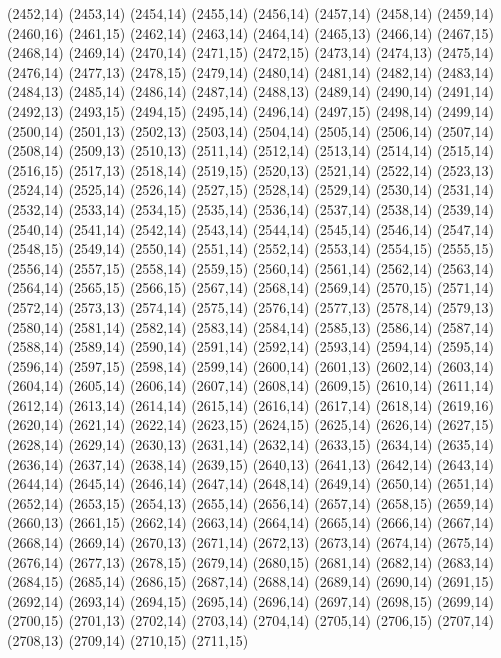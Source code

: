 (2452,14)
(2453,14)
(2454,14)
(2455,14)
(2456,14)
(2457,14)
(2458,14)
(2459,14)
(2460,16)
(2461,15)
(2462,14)
(2463,14)
(2464,14)
(2465,13)
(2466,14)
(2467,15)
(2468,14)
(2469,14)
(2470,14)
(2471,15)
(2472,15)
(2473,14)
(2474,13)
(2475,14)
(2476,14)
(2477,13)
(2478,15)
(2479,14)
(2480,14)
(2481,14)
(2482,14)
(2483,14)
(2484,13)
(2485,14)
(2486,14)
(2487,14)
(2488,13)
(2489,14)
(2490,14)
(2491,14)
(2492,13)
(2493,15)
(2494,15)
(2495,14)
(2496,14)
(2497,15)
(2498,14)
(2499,14)
(2500,14)
(2501,13)
(2502,13)
(2503,14)
(2504,14)
(2505,14)
(2506,14)
(2507,14)
(2508,14)
(2509,13)
(2510,13)
(2511,14)
(2512,14)
(2513,14)
(2514,14)
(2515,14)
(2516,15)
(2517,13)
(2518,14)
(2519,15)
(2520,13)
(2521,14)
(2522,14)
(2523,13)
(2524,14)
(2525,14)
(2526,14)
(2527,15)
(2528,14)
(2529,14)
(2530,14)
(2531,14)
(2532,14)
(2533,14)
(2534,15)
(2535,14)
(2536,14)
(2537,14)
(2538,14)
(2539,14)
(2540,14)
(2541,14)
(2542,14)
(2543,14)
(2544,14)
(2545,14)
(2546,14)
(2547,14)
(2548,15)
(2549,14)
(2550,14)
(2551,14)
(2552,14)
(2553,14)
(2554,15)
(2555,15)
(2556,14)
(2557,15)
(2558,14)
(2559,15)
(2560,14)
(2561,14)
(2562,14)
(2563,14)
(2564,14)
(2565,15)
(2566,15)
(2567,14)
(2568,14)
(2569,14)
(2570,15)
(2571,14)
(2572,14)
(2573,13)
(2574,14)
(2575,14)
(2576,14)
(2577,13)
(2578,14)
(2579,13)
(2580,14)
(2581,14)
(2582,14)
(2583,14)
(2584,14)
(2585,13)
(2586,14)
(2587,14)
(2588,14)
(2589,14)
(2590,14)
(2591,14)
(2592,14)
(2593,14)
(2594,14)
(2595,14)
(2596,14)
(2597,15)
(2598,14)
(2599,14)
(2600,14)
(2601,13)
(2602,14)
(2603,14)
(2604,14)
(2605,14)
(2606,14)
(2607,14)
(2608,14)
(2609,15)
(2610,14)
(2611,14)
(2612,14)
(2613,14)
(2614,14)
(2615,14)
(2616,14)
(2617,14)
(2618,14)
(2619,16)
(2620,14)
(2621,14)
(2622,14)
(2623,15)
(2624,15)
(2625,14)
(2626,14)
(2627,15)
(2628,14)
(2629,14)
(2630,13)
(2631,14)
(2632,14)
(2633,15)
(2634,14)
(2635,14)
(2636,14)
(2637,14)
(2638,14)
(2639,15)
(2640,13)
(2641,13)
(2642,14)
(2643,14)
(2644,14)
(2645,14)
(2646,14)
(2647,14)
(2648,14)
(2649,14)
(2650,14)
(2651,14)
(2652,14)
(2653,15)
(2654,13)
(2655,14)
(2656,14)
(2657,14)
(2658,15)
(2659,14)
(2660,13)
(2661,15)
(2662,14)
(2663,14)
(2664,14)
(2665,14)
(2666,14)
(2667,14)
(2668,14)
(2669,14)
(2670,13)
(2671,14)
(2672,13)
(2673,14)
(2674,14)
(2675,14)
(2676,14)
(2677,13)
(2678,15)
(2679,14)
(2680,15)
(2681,14)
(2682,14)
(2683,14)
(2684,15)
(2685,14)
(2686,15)
(2687,14)
(2688,14)
(2689,14)
(2690,14)
(2691,15)
(2692,14)
(2693,14)
(2694,15)
(2695,14)
(2696,14)
(2697,14)
(2698,15)
(2699,14)
(2700,15)
(2701,13)
(2702,14)
(2703,14)
(2704,14)
(2705,14)
(2706,15)
(2707,14)
(2708,13)
(2709,14)
(2710,15)
(2711,15)
